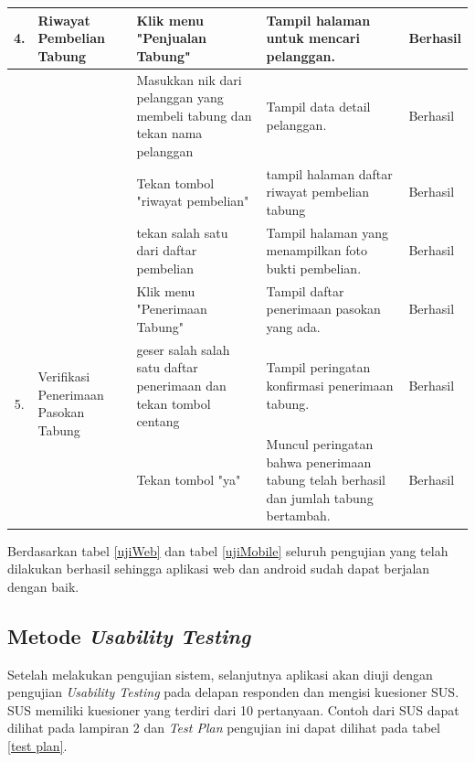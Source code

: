 \begin{longtable}{ |c|p{3cm}|p{3cm}|p{3cm}|p{2cm}|}
		\multirow{1}{*}{4.}  & 	\multirow{1}{*}{\parbox{3cm}{\centering Riwayat Pembelian Tabung}} & Klik menu "Penjualan Tabung"          & Tampil halaman untuk mencari pelanggan.             & Berhasil \\ \hline
		 \multirow{3}{*}{} & \multirow{3}{*}{} & Masukkan nik dari pelanggan yang membeli tabung dan tekan nama pelanggan           & Tampil data detail pelanggan.             & Berhasil \\ \cline{3-5}
		& & Tekan tombol "riwayat pembelian"           & tampil halaman daftar riwayat pembelian tabung & Berhasil
		\\ \cline{3-5}
		& & tekan salah satu dari daftar pembelian           & Tampil halaman yang menampilkan foto bukti pembelian.             & Berhasil \\ \hline
	
		
		
		\multirow{3}{*}{5.}  & 	\multirow{3}{*}{\parbox{3cm}{\centering Verifikasi Penerimaan Pasokan Tabung}} & Klik menu "Penerimaan Tabung"           & Tampil daftar penerimaan pasokan yang ada.             & Berhasil \\ \cline{3-5}
		& & geser salah salah satu daftar penerimaan dan tekan tombol centang           & Tampil peringatan konfirmasi penerimaan tabung.             & Berhasil \\ \cline{3-5}
		& & Tekan tombol "ya"           & Muncul peringatan bahwa penerimaan tabung telah berhasil dan jumlah tabung bertambah.             & Berhasil \\ \hline
		
	\end{longtable}

	Berdasarkan tabel \ref{ujiWeb} dan tabel \ref{ujiMobile} seluruh pengujian yang telah dilakukan berhasil sehingga aplikasi web dan android sudah dapat berjalan dengan baik. 
	
	\subsection{Metode \textit{Usability Testing}}
	
	Setelah melakukan pengujian sistem, selanjutnya aplikasi akan diuji dengan pengujian \textit{Usability Testing} pada delapan responden dan mengisi kuesioner SUS. SUS memiliki kuesioner yang terdiri dari 10 pertanyaan. Contoh dari SUS dapat dilihat pada lampiran 2 dan \textit{Test Plan} pengujian ini dapat dilihat pada tabel \ref{test plan}.
	
